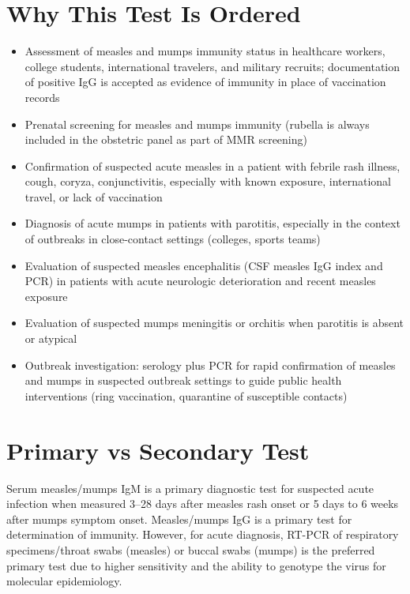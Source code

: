 \section*{Why This Test Is Ordered}
\begin{itemize}
  \item Assessment of measles and mumps immunity status in healthcare workers, college students, international travelers, and military recruits; documentation of positive IgG is accepted as evidence of immunity in place of vaccination records \cite{cdc2021measles}
  \item Prenatal screening for measles and mumps immunity (rubella is always included in the obstetric panel as part of MMR screening)
  \item Confirmation of suspected acute measles in a patient with febrile rash illness, cough, coryza, conjunctivitis, especially with known exposure, international travel, or lack of vaccination
  \item Diagnosis of acute mumps in patients with parotitis, especially in the context of outbreaks in close-contact settings (colleges, sports teams)
  \item Evaluation of suspected measles encephalitis (CSF measles IgG index and PCR) in patients with acute neurologic deterioration and recent measles exposure
  \item Evaluation of suspected mumps meningitis or orchitis when parotitis is absent or atypical
  \item Outbreak investigation: serology plus PCR for rapid confirmation of measles and mumps in suspected outbreak settings to guide public health interventions (ring vaccination, quarantine of susceptible contacts)
\end{itemize}

\section*{Primary vs Secondary Test}
Serum measles/mumps IgM is a primary diagnostic test for suspected acute infection when measured 3--28 days after measles rash onset or 5 days to 6 weeks after mumps symptom onset. Measles/mumps IgG is a primary test for determination of immunity. However, for acute diagnosis, RT-PCR of respiratory specimens/throat swabs (measles) or buccal swabs (mumps) is the preferred primary test due to higher sensitivity and the ability to genotype the virus for molecular epidemiology.

